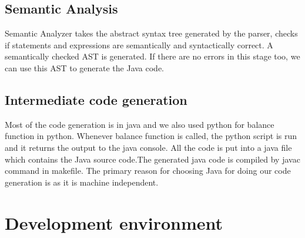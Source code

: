 \documentclass[english,a4paper,12pt]{report}
\begin{document}
\section{Semantic Analysis}
Semantic Analyzer takes the abstract syntax tree generated by the parser, checks if statements and expressions are semantically and syntactically correct. A semantically checked AST is generated. If there are no errors in this stage too, we can use this AST to generate the Java code.

\section{Intermediate code generation}
Most of the code generation is in java and we also used python for balance function in python. Whenever balance function is called, the python script is run and it returns the output to the java console. All the code is put into a java file which contains the Java source code.The generated java code is compiled by javac command in makefile. The primary reason for choosing Java for doing our code generation is as it is machine independent.
\chapter{Development environment}
\end{document}
